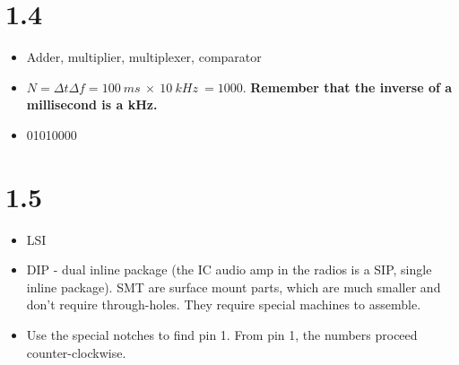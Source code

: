 \documentclass[10pt]{article}
\begin{document}
\section{1.4}

\begin{itemize}
\item Adder, multiplier, multiplexer, comparator
\item $N = \Delta t \Delta f = 100~ms~\times~10~kHz~=1000$.  \textbf{Remember that the inverse of a millisecond is a kHz.}
\item 01010000
\end{itemize}

\section{1.5}

\begin{itemize}
\item LSI
\item DIP - dual inline package (the IC audio amp in the radios is a SIP, single inline package). SMT are surface mount parts, which are much smaller and don't require through-holes.  They require special machines to assemble.
\item Use the special notches to find pin 1.  From pin 1, the numbers proceed counter-clockwise.
\end{itemize}
\end{document}
